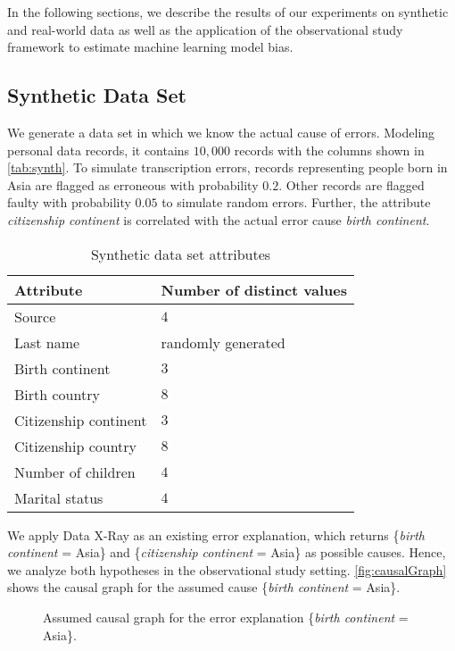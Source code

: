\documentclass[acmsmall, nonacm, screen]{acmart} %
\begin{document}
In the following sections, we describe the results of our experiments on synthetic and real-world data as well as the application of the observational study framework to estimate machine learning model bias.\\

\subsection{Synthetic Data Set}
We generate a data set in which we know the actual cause of errors. Modeling personal data records, it contains $10,000$ records with the columns shown in \autoref{tab:synth}. 
To simulate transcription errors, records representing people born in Asia are flagged as erroneous with probability $0.2$. Other records are flagged faulty with probability $0.05$ to simulate random errors.
Further, the attribute \textit{citizenship continent} is correlated with the actual error cause \textit{birth continent}.
\begin{table}[htbp]
\begin{center}
\begin{tabular}{ll}
\toprule 
Attribute & Number of distinct values \\ 
\midrule 
Source & $4$ \\ 
Last name  & randomly generated \\ 
Birth continent  & $3$ \\ 
Birth country  & $8$ \\ 
Citizenship continent  & $3$ \\ 
Citizenship country  & $8$ \\ 
Number of children & $4$ \\ 
Marital status & $4$ \\ 
\bottomrule 
\end{tabular} 
\caption{Synthetic data set attributes}
\label{tab:synth}
\end{center}
\end{table}
We apply Data X-Ray as an existing error explanation, which returns \{\textit{birth continent} = Asia\} and \{\textit{citizenship continent} = Asia\} as possible causes. Hence, we analyze both hypotheses in the observational study setting. \autoref{fig:causalGraph} shows the causal graph for the assumed cause \{\textit{birth continent} = Asia\}.\\
\begin{figure}[htbp]

\caption{Assumed causal graph for the error explanation \{\textit{birth continent} = Asia\}.}
\label{fig:causalGraph}
\end{figure}
\end{document}
